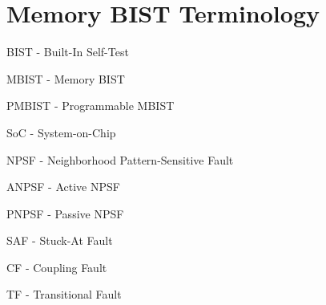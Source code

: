 \section{Memory BIST Terminology}
\label{sect:int-terminology}
BIST - Built-In Self-Test

MBIST - Memory BIST

PMBIST - Programmable MBIST

SoC - System-on-Chip

NPSF - Neighborhood Pattern-Sensitive Fault

ANPSF - Active NPSF

PNPSF - Passive NPSF

SAF - Stuck-At Fault

CF - Coupling Fault

TF - Transitional Fault
